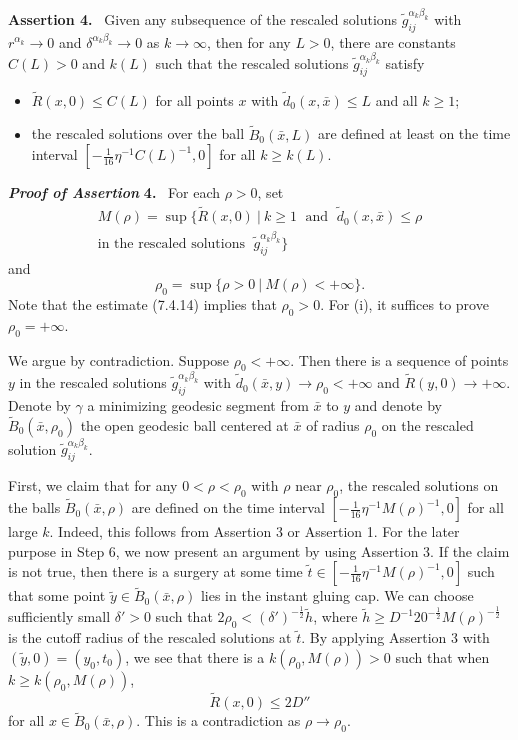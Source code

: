 \medskip
{\bf Assertion 4.} \ Given any subsequence of the rescaled
solutions $\tilde{g}^{\alpha_k\beta_k}_{ij}$ with
$r^{\alpha_k}\rightarrow 0$ and
$\delta^{\alpha_k\beta_k}\rightarrow 0$ as $k\rightarrow \infty$,
then for any $L>0$, there are constants $C(L)>0$ and $k(L)$ such
that the rescaled solutions $\tilde{g}^{\alpha_k\beta_k}_{ij}$
satisfy
\begin{itemize}
\item[(i)] $\tilde{R}(x,0)\leq C(L)$ for all points $x$ with
$\tilde{d}_{0}(x,\bar{x})\leq L$ and all $k \geq 1$; \item[(ii)]
the rescaled solutions over the ball $\tilde{B}_{0}(\bar{x},L)$
are defined at least on the time interval
$[-\frac{1}{16}\eta^{-1}C(L)^{-1},0]$ for all $k\geq k(L)$.
\end{itemize}

\medskip
{\bf \em Proof of Assertion} {\bf 4.} \ For each $\rho>0$, set
\begin{multline*}
M(\rho)=\sup\Big\{\tilde{R}(x,0)\ |\ k \geq 1\; \mbox{ and }\;
\tilde{d}_0(x,\bar{x})\leq\rho \\
\mbox{in the rescaled solutions } \;
\tilde{g}^{\alpha_k\beta_k}_{ij}\Big\}
\end{multline*}
and
$$
\rho_0=\sup\{\rho > 0\ |\ M(\rho)<+\infty\}.
$$
Note that the estimate (7.4.14) implies that $\rho_0>0$. For (i),
it suffices to prove $\rho_0=+\infty$.

We argue by contradiction. Suppose $\rho_0<+\infty$. Then there is
a sequence of points $y$ in the rescaled solutions
$\tilde{g}^{\alpha_k\beta_k}_{ij}$ with
$\tilde{d}_0(\bar{x},y)\rightarrow\rho_0<+\infty$ and
$\tilde{R}(y,0)\rightarrow +\infty$. Denote by $\gamma$ a
minimizing geodesic segment from $\bar{x}$ to $y$ and denote by
$\tilde{B}_0(\bar{x},\rho_0)$ the open geodesic ball centered at
$\bar{x}$ of radius $\rho_0$ on the rescaled solution
$\tilde{g}^{\alpha_k\beta_k}_{ij}$.

First, we claim that for any $0<\rho<\rho_0$ with $\rho$ near
$\rho_0$, the rescaled solutions on the balls
$\tilde{B}_{0}(\bar{x},\rho)$ are defined on the time interval
$[-\frac{1}{16}\eta^{-1}M(\rho)^{-1},0]$ for all large $k$.
Indeed, this follows from Assertion 3 or Assertion 1. For the
later purpose in Step 6, we now present an argument by using
Assertion 3.  If the claim is not true, then there is a surgery at
some time $\tilde{t} \in [-\frac{1}{16}\eta^{-1}M(\rho)^{-1},0]$
such that some point $\tilde{y}\in \tilde{B}_{0}(\bar{x},\rho) $
lies in the instant gluing cap.  We can choose sufficiently small
$\delta'>0$ such that $2\rho_0<(\delta')^{-\frac{1}{2}}\tilde{h}$,
where $\tilde{h} \geq
D^{-1}20^{-\frac{1}{2}}M(\rho)^{-\frac{1}{2}}$ is the cutoff
radius of the rescaled solutions at $\tilde{t}$. By applying
Assertion 3 with $(\tilde{y},0)=(y_0,t_0)$, we see that there is a
$k(\rho_0,M(\rho))>0$ such that when $k\geq k(\rho_0,M(\rho))$,
$$
\widetilde{R}(x,0)\leq 2D''
$$
for all $x\in \widetilde{B}_{0}(\bar{x},\rho)$. This is a
contradiction as $\rho\rightarrow\rho_0$.

